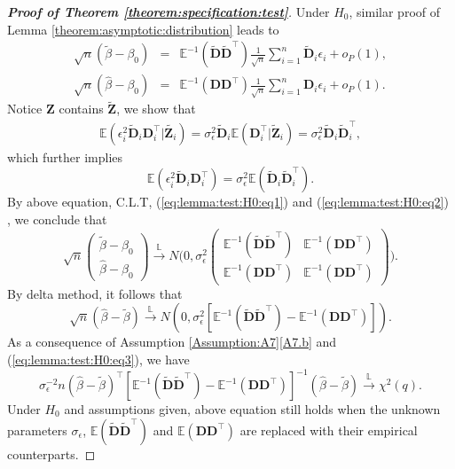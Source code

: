 \documentclass[11pt, preprint]{imsart}
\numberwithin{equation}{section}
\def \bfD{\mathbf{D}}
\def \bfZ{\mathbf{Z}}
\def \bfD{\mathbf{D}}
\def \ev{\mathbb{E}}
\def \cid{\xrightarrow[\text{}]{\text{$\mathbb{L}$}}}
\theoremstyle{plain}
\theoremstyle{definition}
\begin{document}
\begin{proof}[\textbf{Proof of Theorem \ref{theorem:specification:test}}]
Under $H_0$, similar proof of  Lemma \ref{theorem:asymptotic:distribution} leads to 
\begin{eqnarray}
	\sqrt{n}(\widetilde{\beta}-\beta_0)&=&\ev^{-1}(\widetilde{\bfD}\widetilde{\bfD}^\top)\frac{1}{\sqrt{n}}\sum_{i=1}^n\widetilde{\bfD}_i\epsilon_i+o_P(1),\label{eq:lemma:test:H0:eq1}\\
	\sqrt{n}(\widehat{\beta}-\beta_0)&=&\ev^{-1}({\bfD}{\bfD}^\top)\frac{1}{\sqrt{n}}\sum_{i=1}^n{\bfD}_i\epsilon_i+o_P(1).\label{eq:lemma:test:H0:eq2}
\end{eqnarray}
Notice $\bfZ$ contains $\widetilde{\bfZ}$, we show that
\begin{eqnarray*}
	\ev(\epsilon_i^2 \widetilde{\bfD}_i\bfD^\top_i| \widetilde{\bfZ_i})=\sigma_\epsilon^2 \widetilde{\bfD}_i\ev(\bfD^\top_i | \widetilde{\bfZ}_i)=\sigma_\epsilon^2 \widetilde{\bfD}_i \widetilde{\bfD}_i^\top,
\end{eqnarray*}
which further implies
\begin{equation*}
	\ev(\epsilon_i^2 \widetilde{\bfD}_i\bfD^\top_i)=\sigma_\epsilon^2 \ev(\widetilde{\bfD}_i \widetilde{\bfD}_i^\top).
\end{equation*}
By above equation, C.L.T, (\ref{eq:lemma:test:H0:eq1}) and (\ref{eq:lemma:test:H0:eq2}) , we conclude that
\begin{equation*}
	\sqrt{n}\begin{pmatrix}
	\widetilde{\beta}-\beta_0\\
	\widehat{\beta}-\beta_0
	\end{pmatrix}\cid N\bigg(0, \sigma_\epsilon^2\begin{pmatrix}
	\ev^{-1}(\widetilde{\bfD}\widetilde{\bfD}^\top) &  \ev^{-1}({\bfD}{\bfD}^\top)\\
	 \ev^{-1}({\bfD}{\bfD}^\top) & \ev^{-1}({\bfD}{\bfD}^\top)
	\end{pmatrix}\bigg).
\end{equation*}
By delta method, it follows that
\begin{equation}\label{eq:lemma:test:H0:eq3}
	\sqrt{n}(\widehat{\beta}-\widetilde{\beta})\cid N(0, \sigma_\epsilon^2[\ev^{-1}(\widetilde{\bfD}\widetilde{\bfD}^\top)-\ev^{-1}({\bfD}{\bfD}^\top)]).
\end{equation}
As a consequence of Assumption \ref{Assumption:A7}\ref{A7.b} and (\ref{eq:lemma:test:H0:eq3}), we have
\begin{equation*}
	\sigma_\epsilon^{-2} n(\widehat{\beta}-\widetilde{\beta})^\top[\ev^{-1}(\widetilde{\bfD}\widetilde{\bfD}^\top)-\ev^{-1}({\bfD}{\bfD}^\top)]^{-1}(\widehat{\beta}-\widetilde{\beta})\cid \chi^2(q).
\end{equation*}
Under $H_0$ and assumptions given, above equation still holds when the unknown parameters $\sigma_\epsilon$, $\ev(\widetilde{\bfD}\widetilde{\bfD}^\top)$ and $\ev({\bfD}{\bfD}^\top)$ are replaced with their empirical counterparts.



\end{proof}
\end{document}
